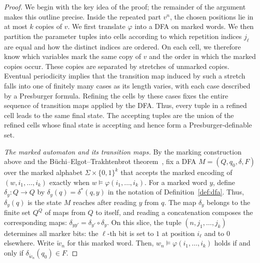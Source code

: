 \documentclass[11pt]{article}
\theoremstyle{definition}
\begin{document}
\begin{proof}
We begin with the key idea of the proof; the remainder of the argument makes
this outline precise.  Inside the repeated part $v^n$, the chosen positions lie
in at most $k$ copies of $v$.  We first translate $\varphi$ into a DFA on marked
words.  We then partition the parameter tuples into cells according to which
repetition indices $j_\ell$ are equal and how the distinct indices are ordered.
On each cell, we therefore know which variables mark the same copy of $v$ and
the order in which the marked copies occur.  These copies are separated by
stretches of unmarked copies.  Eventual periodicity implies that the transition
map induced by such a stretch falls into one of finitely many cases as its
length varies, with each case described by a Presburger formula.  Refining
the cells by these cases fixes the entire sequence of transition maps applied
by the DFA.  Thus, every tuple in a refined cell leads to the same final state.
The accepting tuples are the union of the refined cells whose final state is
accepting and hence form a Presburger-definable set.

\vspace{0.5em}
\noindent\emph{The marked automaton and its transition maps.}
By the marking construction above and the
B\"uchi--Elgot--Trakhtenbrot theorem~\cite{Thomas1997}, fix a DFA
$M=(Q,q_0,\delta,F)$ over the marked alphabet $\Sigma\times\{0,1\}^k$
that accepts the marked encoding of $(w,i_1,\ldots,i_k)$ exactly when
$w\models\varphi(i_1,\ldots,i_k)$.  For a marked word $y$, define
$\delta_y\colon Q\to Q$ by $\delta_y(q)=\delta^*(q,y)$ in the notation of
Definition~\ref{def:dfa}.  Thus, $\delta_y(q)$ is the state $M$ reaches after
reading $y$ from $q$.  The map $\delta_y$ belongs to the finite set $Q^Q$ of
maps from $Q$ to itself, and reading a concatenation composes the corresponding
maps:
$\delta_{yy'}=\delta_{y'}\circ\delta_y$.  On this slice, the tuple
$(n,j_1,\ldots,j_k)$ determines all marker bits: the $\ell$-th bit is set to
$1$ at position $i_\ell$ and to $0$ elsewhere.  Write $\widetilde w_n$ for this
marked word.  Then,
$w_n\models\varphi(i_1,\ldots,i_k)$ holds if and only if
$\delta_{\widetilde w_n}(q_0)\in F$.


\end{proof}
\end{document}
